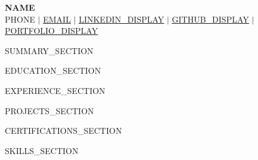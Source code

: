 \documentclass[letterpaper,11pt]{article}
\begin{document}
\begin{center}
    \textbf{\Huge \scshape {{NAME}}} \\ \vspace{1pt}
    \small {{PHONE}} $|$
    \href{mailto:{{EMAIL}}}{\underline{{{EMAIL}}}} $|$
    \href{{{LINKEDIN_URL}}}{\underline{{{LINKEDIN_DISPLAY}}}} $|$
    \href{{{GITHUB_URL}}}{\underline{{{GITHUB_DISPLAY}}}} $|$
    \href{{{PORTFOLIO_URL}}}{\underline{{{PORTFOLIO_DISPLAY}}}}
\end{center}

{{SUMMARY_SECTION}}

{{EDUCATION_SECTION}}


{{EXPERIENCE_SECTION}}


{{PROJECTS_SECTION}}


{{CERTIFICATIONS_SECTION}}


{{SKILLS_SECTION}}

\end{document}
